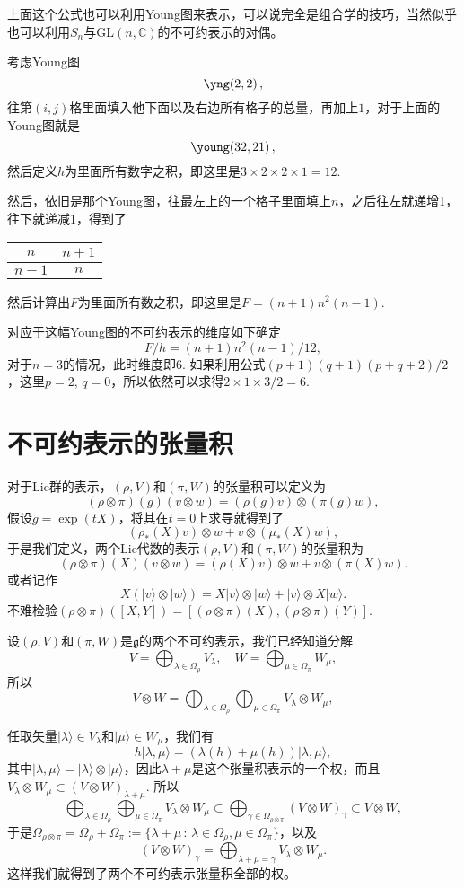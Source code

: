 \documentclass[9pt]{extarticle}
\newcommand{\cc}{\mathbb{C}}
\newcommand{\lag}{{\mathfrak{g}}}
\begin{document}
上面这个公式也可以利用Young图来表示，可以说完全是组合学的技巧，当然似乎也可以利用$S_n$与$\mathrm{GL}(n,\cc)$的不可约表示的对偶。

考虑Young图
\[
	\yng(2,2)\,,
\]
往第$(i,j)$格里面填入他下面以及右边所有格子的总量，再加上$1$，对于上面的Young图就是
\[
	\young(32,21)\,,
\]
然后定义$h$为里面所有数字之积，即这里是$3\times 2\times 2\times 1=12$.

然后，依旧是那个Young图，往最左上的一个格子里面填上$n$，之后往左就递增1，往下就递减1，得到了
\begin{center}
  \begin{tabular}{ | c | c |}
    \hline
    $n$ & $n+1$  \\ \hline
    $n-1$ & $n$\\
    \hline
  \end{tabular}
\end{center}
然后计算出$F$为里面所有数之积，即这里是$F=(n+1)n^2(n-1)$.

对应于这幅Young图的不可约表示的维度如下确定
\[
	F/h=(n+1)n^2(n-1)/12,
\]
对于$n=3$的情况，此时维度即$6$. 如果利用公式$(p+1)(q+1)(p+q+2)/2$，这里$p=2$, $q=0$，所以依然可以求得$2\times 1\times 3/2=6$.

\section{不可约表示的张量积}

对于Lie群的表示，$(\rho,V)$和$(\pi,W)$的张量积可以定义为
\[
	(\rho\otimes\pi)(g)(v\otimes w)=(\rho(g)v)\otimes(\pi(g)w),
\]
假设$g=\exp(tX)$，将其在$t=0$上求导就得到了
\[
	(\rho_*(X)v)\otimes w+ v \otimes (\mu_*(X)w),
\]
于是我们定义，两个Lie代数的表示$(\rho,V)$和$(\pi,W)$的张量积为
\[
	(\rho\otimes\pi)(X)(v\otimes w)=(\rho(X)v)\otimes w+ v \otimes (\pi(X)w).
\]
或者记作
\[
	X(|v\rangle\otimes|w\rangle)=X|v\rangle\otimes|w\rangle+|v\rangle\otimes X|w\rangle.
\]
不难检验$(\rho\otimes\pi)([X,Y])=[(\rho\otimes\pi)(X),(\rho\otimes\pi)(Y)]$.

\para 设$(\rho,V)$和$(\pi,W)$是$\lag$的两个不可约表示，我们已经知道分解
\[
	V=\bigoplus_{\lambda\in\Omega_\rho} V_\lambda,\quad W=\bigoplus_{\mu\in\Omega_\pi} W_\mu,
\]
所以
\[
	V\otimes W=\bigoplus_{\lambda\in\Omega_\rho}\bigoplus_{\mu\in\Omega_\pi} V_\lambda\otimes W_\mu,
\]

任取矢量$|\lambda\rangle\in V_\lambda$和$|\mu\rangle\in W_\mu$，我们有
\[
	h|\lambda,\mu\rangle=(\lambda(h)+\mu(h))|\lambda,\mu\rangle,
\]
其中$|\lambda,\mu\rangle=|\lambda\rangle\otimes |\mu\rangle$，因此$\lambda+\mu$是这个张量积表示的一个权，而且$V_\lambda\otimes W_\mu \subset (V\otimes W)_{\lambda+\mu}$. 所以
\[
	\bigoplus_{\lambda\in\Omega_\rho}\bigoplus_{\mu\in\Omega_\pi} V_\lambda\otimes W_\mu\subset \bigoplus_{\gamma\in \Omega_{\rho\otimes\pi}} (V\otimes W)_{\gamma}\subset V\otimes W,
\]
于是$\Omega_{\rho\otimes\pi}=\Omega_{\rho}+\Omega_{\pi}:=\{\lambda+\mu\,:\,\lambda\in\Omega_\rho,\mu\in\Omega_\pi\}$，以及
\[
	(V\otimes W)_{\gamma}=\bigoplus_{\lambda+\mu=\gamma}V_\lambda\otimes W_\mu.
\]
这样我们就得到了两个不可约表示张量积全部的权。
\end{document}
